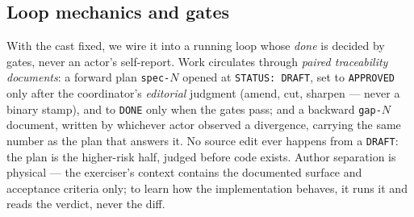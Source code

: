 \documentclass[11pt]{article}
\newcommand{\code}[1]{\texttt{#1}}
\begin{document}
\subsection{Loop mechanics and gates}
\label{sec:mechanics}

With the cast fixed, we wire it into a running loop whose \emph{done} is decided by gates, never
an actor's self-report. Work circulates through \emph{paired traceability documents}: a forward
plan \code{spec-$N$} opened at \code{STATUS: DRAFT}, set to \code{APPROVED} only after the
coordinator's \emph{editorial} judgment (amend, cut, sharpen --- never a binary stamp), and to
\code{DONE} only when the gates pass; and a backward \code{gap-$N$} document, written by whichever
actor observed a divergence, carrying the same number as the plan that answers it. No source edit
ever happens from a \code{DRAFT}: the plan is the higher-risk half, judged before code exists.
Author separation is physical --- the exerciser's context contains the documented surface and
acceptance criteria only; to learn how the implementation behaves, it runs it and reads the
verdict, never the diff.
\end{document}
